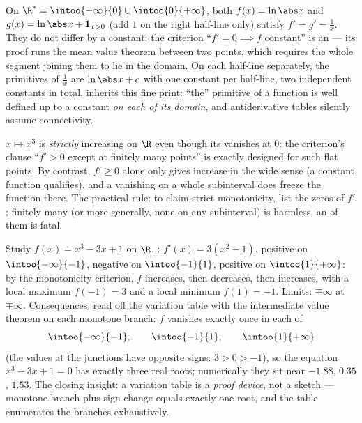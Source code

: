 \begin{example}\label{ex:b1:derivative:intervalmatters}
On $\R^* = \intoo{-\infty}{0} \cup \intoo{0}{+\infty}$, both
$f(x) = \ln\abs x$ and $g(x) = \ln\abs x + \mathbf{1}_{x>0}$
(add $1$ on the right half-line only) satisfy $f' = g' =
\frac1x$. They do not differ by a constant: the criterion
``$f' = 0 \implies f$ constant'' is an \emph{} 
--- its proof runs the mean value theorem between two points,
which requires the whole segment joining them to lie in the
domain. On each half-line separately, the primitives of
$\frac1x$ are $\ln\abs x + c$ with one constant per half-line,
two independent constants in total. 
inherits this fine print: ``the'' primitive of a function is
well defined up to a constant \emph{on each  of its
domain}, and antiderivative tables silently assume connectivity.
\end{example}

\begin{example}\label{ex:b1:derivative:strictness}
$x \mapsto x^3$ is \emph{strictly} increasing on $\R$ even
though its  vanishes at $0$: the criterion's clause
``$f' > 0$ except at finitely many points'' is exactly designed
for such flat points. By contrast, $f' \geq 0$ alone only gives
increase in the wide sense (a constant function qualifies), and
a  vanishing on a whole subinterval does freeze the
function there. The practical rule: to claim strict
monotonicity, list the zeros of $f'$; finitely many (or more
generally, none on any subinterval) is harmless, an  of
them is fatal.
\end{example}

\begin{example}\label{ex:b1:derivative:variations}
Study $f(x) = x^3 - 3x + 1$ on $\R$. : $f'(x) =
3(x^2 - 1)$, positive on $\intoo{-\infty}{-1}$, negative on
$\intoo{-1}{1}$, positive on $\intoo{1}{+\infty}$: by the
monotonicity criterion, $f$ increases, then decreases, then
increases, with a local maximum $f(-1) = 3$ and a local minimum
$f(1) = -1$. Limits: $\mp\infty$ at $\mp\infty$. Consequences,
read off the variation table with the intermediate value
theorem on each monotone branch: $f$ vanishes exactly once in
each of
\[
\intoo{-\infty}{-1}, \qquad \intoo{-1}{1}, \qquad
\intoo{1}{+\infty}
\]
(the values at the junctions have opposite signs: $3 > 0 > -1$),
so the equation $x^3 - 3x + 1 = 0$ has exactly three real
roots; numerically they sit near $-1.88$, $0.35$, $1.53$. The
closing insight: a variation table is a \emph{proof device},
not a sketch --- monotone branch plus sign change equals
exactly one root, and the table enumerates the branches
exhaustively.
\end{example}


